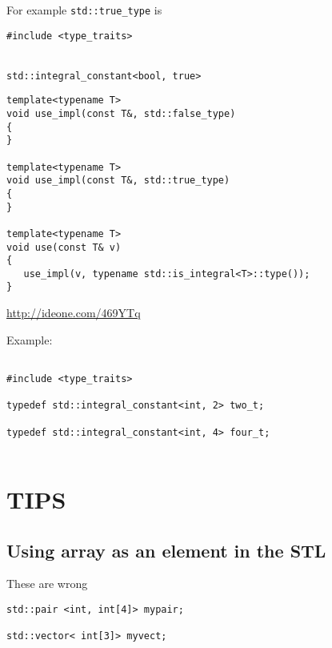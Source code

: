 For example \verb!std::true_type! is 
\begin{verbatim}
#include <type_traits>


std::integral_constant<bool, true>
\end{verbatim}

\begin{verbatim}
template<typename T>
void use_impl(const T&, std::false_type)
{
}

template<typename T>
void use_impl(const T&, std::true_type)
{
}

template<typename T>
void use(const T& v)
{
   use_impl(v, typename std::is_integral<T>::type());
}
\end{verbatim}

\url{http://ideone.com/469YTq}

Example:
\begin{lstlisting}

#include <type_traits>

typedef std::integral_constant<int, 2> two_t;

typedef std::integral_constant<int, 4> four_t;
        
\end{lstlisting}

\section{TIPS}

\subsection{Using array as an element in the STL}

These are wrong
\begin{verbatim}
std::pair <int, int[4]> mypair;

std::vector< int[3]> myvect;
\end{verbatim}

